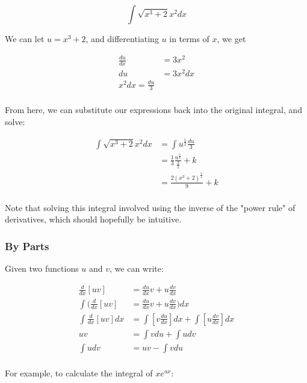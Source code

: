 \documentclass[12pt]{article}
\begin{document}
$$\int \sqrt{x^3+2}x^2 dx$$

We can let $u = x^3+2$, and differentiating $u$ in terms of $x$, we get

\begin{equation}
\begin{split}
    \frac{du}{dx} &= 3x^2\\
    du &= 3x^2 dx\\
    x^2 dx = \frac{du}{3}\\
    \end{split}
\end{equation}

From here, we can substitute our expressions back into the original integral, and solve:

\begin{equation}
    \begin{split}
    \int \sqrt{x^3+2}x^2 dx &= \int u^\frac{1}{2} \frac{du}{3}\\
    &= \frac{1}{3} \frac{u^{\frac{3}{2}}}{\frac{3}{2}} + k\\
    &= \frac{2(x^3+2)^{\frac{3}{2}}}{9} + k\\
    \end{split}
\end{equation}

Note that solving this integral involved using the inverse of the "power rule" of derivatives, which should hopefully be intuitive.

\subsubsection{By Parts}

Given two functions $u$ and $v$, we can write:

\begin{equation}
\begin{split}
    \frac{d}{dx}[uv] &= \frac{du}{dx} v + u \frac{dv}{dx}\\
    \int (\frac{d}{dx}[uv] &= \frac{du}{dx} v + u \frac{dv}{dx})dx\\
    \int \frac{d}{dx} [uv] dx &= \int [v \frac{du}{dx}] dx + \int [u \frac{dv}{dx}] dx\\
    uv &= \int v du + \int u dv\\
    \int u dv &= uv - \int v du\\
\end{split}
\end{equation}

For example, to calculate the integral of $x e^{ax}$:
\end{document}
